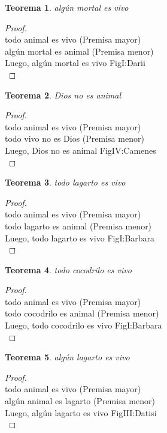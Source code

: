 ﻿\documentclass[12pt]{book}
\newtheorem{theorem}{Teorema}[chapter]
\newtheorem{proof}{Demostración}
\begin{document}
\begin{theorem}
algún mortal es vivo
\label{th: 42}
\end{theorem}\begin{proof}\\todo animal es vivo	 (Premisa mayor) \\algún mortal es animal	 (Premisa menor) \\Luego, algún mortal es vivo	FigI:Darii \\ \end{proof}
\begin{theorem}
Dios no es animal
\label{th: 43}
\end{theorem}\begin{proof}\\todo animal es vivo	 (Premisa mayor) \\todo vivo no es Dios	 (Premisa menor) \\Luego, Dios no es animal	FigIV:Camenes \\ \end{proof}
\begin{theorem}
todo lagarto es vivo
\label{th: 44}
\end{theorem}\begin{proof}\\todo animal es vivo	 (Premisa mayor) \\todo lagarto es animal	 (Premisa menor) \\Luego, todo lagarto es vivo	FigI:Barbara \\ \end{proof}
\begin{theorem}
todo cocodrilo es vivo
\label{th: 45}
\end{theorem}\begin{proof}\\todo animal es vivo	 (Premisa mayor) \\todo cocodrilo es animal	 (Premisa menor) \\Luego, todo cocodrilo es vivo	FigI:Barbara \\ \end{proof}
\begin{theorem}
algún lagarto es vivo
\label{th: 46}
\end{theorem}\begin{proof}\\todo animal es vivo	 (Premisa mayor) \\algún animal es lagarto	 (Premisa menor) \\Luego, algún lagarto es vivo	FigIII:Datisi \\ \end{proof}
\end{document}
